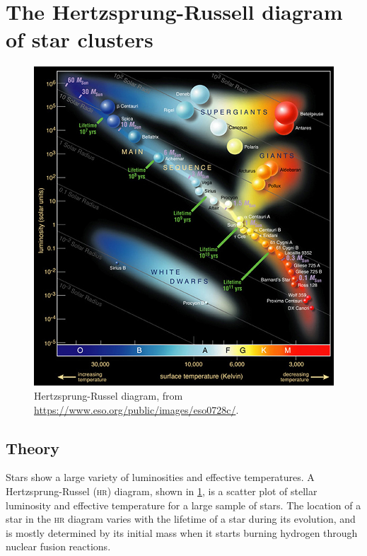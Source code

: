 \documentclass[a4paper, 11pt, fleqn]{memoir}
\begin{document}
\section{The Hertzsprung-Russell diagram of star clusters}
\begin{figure}
    \centering
    \includegraphics[width=\linewidth]{Hertzsprung-Russel_StarData}
    \caption{Hertzsprung-Russel diagram, from \url{https://www.eso.org/public/images/eso0728c/}.}
    \label{fig:hrdiagram}
\end{figure}

\subsection{Theory}

Stars show a large variety of luminosities and effective temperatures.
A Hertzsprung-Russel (\textsc{hr}) diagram, shown in \cref{fig:hrdiagram}, is a scatter plot of stellar luminosity and effective temperature for a large sample of stars.
The location of a star in the \textsc{hr} diagram varies with the lifetime of a star during its evolution, and is mostly determined by its initial mass when it starts burning hydrogen through nuclear fusion reactions.
\end{document}
